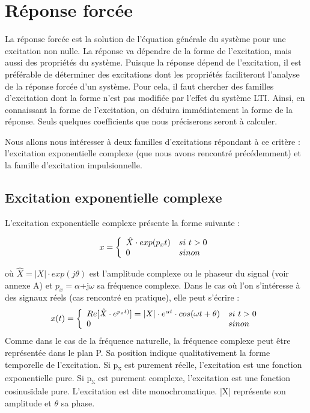 \documentclass[]{report}
\begin{document}
	
	\section{Réponse forcée}
	
	La réponse forcée est la solution de l'équation générale du système pour une excitation non nulle. La réponse va dépendre de la forme de l'excitation, mais aussi des
	propriétés du système. Puisque la réponse dépend de l'excitation, il est
	préférable de déterminer des excitations dont les propriétés
	faciliteront l'analyse de la réponse forcée d'un système. Pour cela, il
	faut chercher des familles d'excitation dont la forme n'est pas modifiée
	par l'effet du système LTI. Ainsi, en connaissant la forme de
	l'excitation, on déduira immédiatement la forme de la réponse. Seuls
	quelques coefficients que nous préciserons seront à calculer.
	
	Nous allons nous intéresser à deux familles d'excitations répondant à ce critère : l'excitation
	exponentielle complexe (que nous avons rencontré précédemment) et la
	famille d'excitation impulsionnelle.
	
	\subsection{Excitation exponentielle complexe}
	L'excitation exponentielle complexe présente la forme suivante :
	
	\begin{equation}\label{exc_expo_complexe}
		x =    \left \{
		\begin{array}{l l}
		\hat{X} \cdot exp(p_{x}t)  & si~t>0 \\
		0   & sinon \\
		\end{array}
		\right .
	\end{equation}
	
	où $ \hat{X} = |X| \cdot exp(j \theta)$ est l'amplitude complexe ou le phaseur du signal (voir annexe A) et $ p_{x} = \alpha $+j$ \omega $ sa fréquence complexe. Dans le cas où l'on s'intéresse à des signaux réels (cas rencontré en pratique), elle peut s'écrire :
	\begin{equation}\label{exc_expo_complexe_reel}
	x(t) =    \left \{
	\begin{array}{l l}
	Re[\hat{X} \cdot e^{p_{x}t)}] = |X| \cdot e^{\alpha t} \cdot cos(\omega t+\theta)  & si~t>0 \\
	0   & sinon \\
	\end{array}
	\right .
	\end{equation}
	Comme dans le cas de la fréquence naturelle, la fréquence complexe peut
	être représentée dans le plan P. Sa position indique qualitativement la
	forme temporelle de l'excitation. Si p\textsubscript{x} est purement
	réelle, l'excitation est une fonction exponentielle pure. Si
	p\textsubscript{x} est purement complexe, l'excitation est une fonction
	cosinusïdale pure. L'excitation est dite monochromatique. |X| représente son amplitude et $\theta$ sa phase.
	
\end{document}
